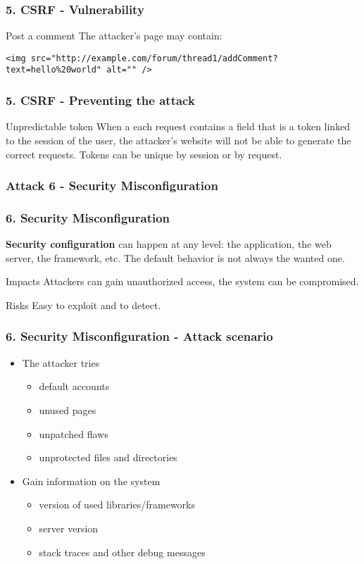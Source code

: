 \begin{frame}[fragile]
\frametitle{5. CSRF - Vulnerability}
\begin{exampleblock}{Post a comment}
The attacker's page may contain:
\begin{lstlisting}
<img src="http://example.com/forum/thread1/addComment?
text=hello%20world" alt="" />
\end{lstlisting}
\end{exampleblock}
\end{frame}

\begin{frame}[fragile]
\frametitle{5. CSRF - Preventing the attack}
\begin{block}{Unpredictable token}
When a each request contains a field that is a token linked to the session of
the user, the attacker's website will not be able to generate the correct
requests.
Tokens can be unique by session or by request.
\end{block}
\end{frame}

\subsubsection{Attack 6 - Security Misconfiguration}

\begin{frame}
\frametitle{6. Security Misconfiguration}
\textbf{Security configuration} can happen at any level: the application, the
web server, the framework, etc.
The default behavior is not always the wanted one.
\begin{block}{Impacts}
Attackers can gain unauthorized access, the system can be compromised.
\end{block}
\begin{block}{Risks}
\alert{Easy} to exploit and to detect.
\end{block}
\end{frame}

\begin{frame}
\frametitle{6. Security Misconfiguration - Attack scenario}
\begin{itemize}
\item The attacker tries
	\begin{itemize}
	\item default accounts
	\item unused pages
	\item unpatched flaws
	\item unprotected files and directories
	\end{itemize}
\item Gain information on the system
	\begin{itemize}
	\item version of used libraries/frameworks
	\item server version
	\item stack traces and other debug messages
	\end{itemize}
\end{itemize}
\end{frame}

